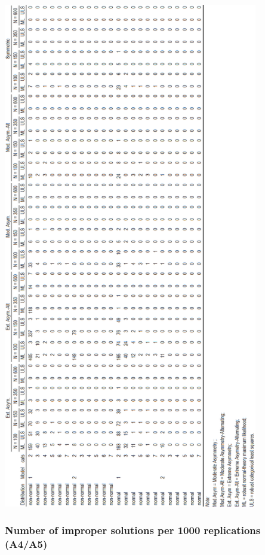 \documentclass[10,a4paperpaper,]{article}
\begin{document}
\includegraphics[width=315pt]{./figures/tabA2_A3}

\subsubsection{Number of improper solutions per 1000 replications (A4/A5)}
\end{document}
